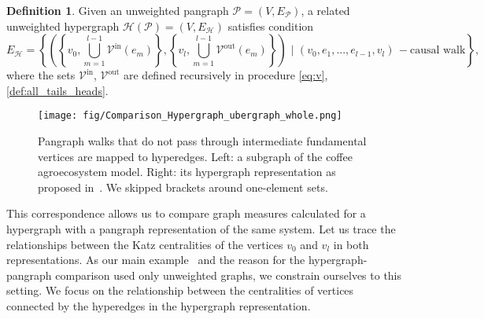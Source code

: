 \documentclass[a4paper,12pt]{article}
\theoremstyle{definition}
\newtheorem{definition}{Definition}
\theoremstyle{remark}
\newcommand{\mH}{\mathcal{H}}
\newcommand{\mP}{\mathcal{P}}
\newcommand{\EH}{E_{\mathcal{H}}}
\newcommand{\EP}{E_{\mathcal{P}}}
\newcommand{\tin}{\mathrm{in}}
\newcommand{\out}{\mathrm{out}}
\begin{document}
\begin{definition}\label{def:related_pangraph}
    Given an unweighted pangraph $\mP = (V, \EP)$, a related unweighted hypergraph $\mH(\mP) =(V, \EH)$ satisfies condition
    \begin{equation*}
    \EH=\left\{\left(\left\{v_0,\bigcup_{m=1}^{l-1}\mathcal{V}^{\textrm{in}}(e_m)\right\},\left\{v_l,\bigcup_{m=1}^{l-1}\mathcal{V}^{\textrm{out}}(e_m)\right\}\right)\,\,|\,\, (v_0, e_1, ... , e_{l-1},v_l)\,-\textrm{causal walk}\right\},
    \end{equation*}
    where the sets $\mathcal{V}^{\tin}$, $\mathcal{V}^{\out}$ are defined recursively in procedure \eqref{eq:v}, \eqref{def:all_tails_heads}.
\end{definition}


\begin{figure}[ht]
    \centering\texttt{[image: fig/Comparison\_Hypergraph\_ubergraph\_whole.png]}
    \caption{Pangraph walks that do not pass through intermediate fundamental vertices are mapped to hyperedges. Left: a subgraph of the coffee agroecosystem model. Right: its hypergraph representation as proposed in~\cite{GOLUBSKI2016344}. We skipped brackets around one-element sets.}\label{fig:pangraph_hypergraph_mapping}
\end{figure}

This correspondence allows us to compare graph measures calculated for a hypergraph with a pangraph representation of the same system. Let us trace the relationships between the Katz centralities of the vertices $v_0$ and $v_l$ in both representations. As our main example~\cite{GOLUBSKI2016344} and the reason for the hypergraph-pangraph comparison used only unweighted graphs, we constrain ourselves to this setting. We focus on the relationship between the centralities of vertices connected by the hyperedges in the hypergraph representation. 
\end{document}
